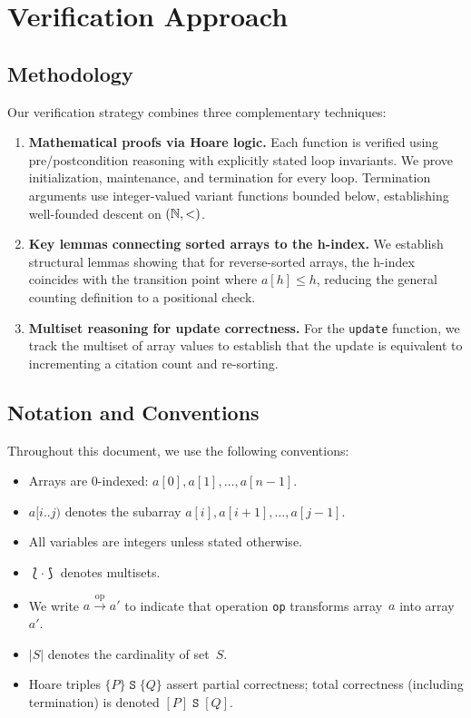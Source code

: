 \section{Verification Approach}
\label{sec:approach}

\subsection{Methodology}

Our verification strategy combines three complementary techniques:

\begin{enumerate}[label=(\roman*)]
  \item \textbf{Mathematical proofs via Hoare logic.}
    Each function is verified using pre/postcondition reasoning with
    explicitly stated loop invariants. We prove initialization, maintenance,
    and termination for every loop. Termination arguments use integer-valued
    variant functions bounded below, establishing well-founded descent on $(\mathbb{N}, <)$.

  \item \textbf{Key lemmas connecting sorted arrays to the h-index.}
    We establish structural lemmas showing that for reverse-sorted arrays,
    the h-index coincides with the transition point where $a[h] \leq h$,
    reducing the general counting definition to a positional check.

  \item \textbf{Multiset reasoning for update correctness.}
    For the \texttt{update} function, we track the multiset of array values
    to establish that the update is equivalent to incrementing a citation count
    and re-sorting.
\end{enumerate}

\subsection{Notation and Conventions}

Throughout this document, we use the following conventions:

\begin{itemize}
  \item Arrays are 0-indexed: $a[0], a[1], \ldots, a[n-1]$.
  \item $a[i..j)$ denotes the subarray $a[i], a[i{+}1], \ldots, a[j{-}1]$.
  \item All variables are integers unless stated otherwise.
  \item $\lbag \cdot \rbag$ denotes multisets.
  \item We write $a \xrightarrow{\text{op}} a'$ to indicate that operation \texttt{op}
    transforms array~$a$ into array~$a'$.
  \item $|S|$ denotes the cardinality of set~$S$.
  \item Hoare triples $\{P\}\;\mathtt{S}\;\{Q\}$ assert partial correctness;
    total correctness (including termination) is denoted $[P]\;\mathtt{S}\;[Q]$.
\end{itemize}

